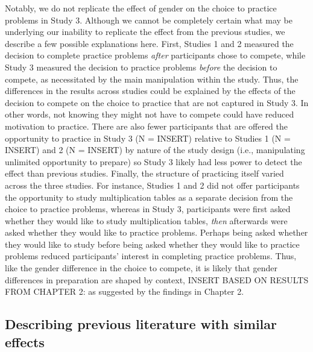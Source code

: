 \documentclass[a4paper, nobind]{templates/ociamthesis}
\begin{document}
Notably, we do not replicate the effect of gender on the choice to practice problems in Study 3. Although we cannot be completely certain what may be underlying our inability to replicate the effect from the previous studies, we describe a few possible explanations here. First, Studies 1 and 2 measured the decision to complete practice problems \emph{after} participants chose to compete, while Study 3 measured the decision to practice problems \emph{before} the decision to compete, as necessitated by the main manipulation within the study. Thus, the differences in the results across studies could be explained by the effects of the decision to compete on the choice to practice that are not captured in Study 3. In other words, not knowing they might not have to compete could have reduced motivation to practice. There are also fewer participants that are offered the opportunity to practice in Study 3 (N = INSERT) relative to Studies 1 (N = INSERT) and 2 (N = INSERT) by nature of the study design (i.e., manipulating unlimited opportunity to prepare) so Study 3 likely had less power to detect the effect than previous studies. Finally, the structure of practicing itself varied across the three studies. For instance, Studies 1 and 2 did not offer participants the opportunity to study multiplication tables as a separate decision from the choice to practice problems, whereas in Study 3, participants were first asked whether they would like to study multiplication tables, \emph{then} afterwards were asked whether they would like to practice problems. Perhaps being asked whether they would like to study before being asked whether they would like to practice problems reduced participants' interest in completing practice problems. Thus, like the gender difference in the choice to compete, it is likely that gender differences in preparation are shaped by context, INSERT BASED ON RESULTS FROM CHAPTER 2: as suggested by the findings in Chapter 2.

\hypertarget{describing-previous-literature-with-similar-effects}{%
\subsection{Describing previous literature with similar effects}\label{describing-previous-literature-with-similar-effects}}
\end{document}
